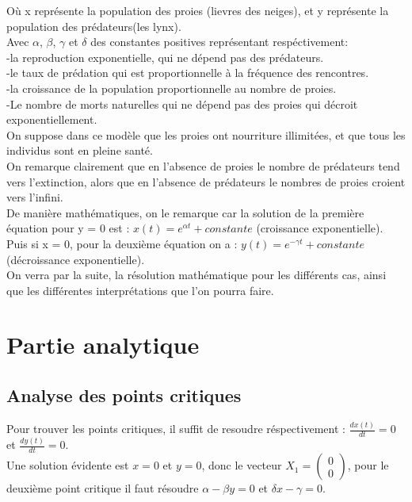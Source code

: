 \documentclass[a4paper,16pt,twoside]{report}
\begin{document}
Où x représente la population des proies (lievres des neiges), et y représente la population des prédateurs(les lynx).\\




Avec $\alpha$, $\beta$, $\gamma$ et $\delta$ des constantes positives représentant respéctivement:\\
    -la reproduction exponentielle, qui ne dépend pas des prédateurs.\\
    -le taux de prédation qui est proportionnelle à la fréquence des rencontres.\\
    -la croissance de la population proportionnelle au nombre de proies.\\
    -Le nombre de morts naturelles qui ne dépend pas des proies qui décroit exponentiellement.\\
    
    
    On suppose dans ce modèle que les proies ont nourriture illimitées, et que tous les individus sont en pleine santé.\\
    On remarque clairement que en l'absence de proies le nombre de prédateurs tend vers l'extinction, alors que en l'absence de prédateurs le nombres de proies croient vers l'infini.\\
    
    
    
    De manière mathématiques, on le remarque car la solution de la première équation pour y = 0 est : $x(t)=e^{\alpha t}+constante$ (croissance exponentielle).\\ Puis si x = 0, pour la deuxième équation on a : $y(t)=e^{- \gamma t}+ constante$ (décroissance exponentielle).\\
    
    
    
    On verra par la suite, la résolution mathématique pour les différents cas, ainsi que les différentes interprétations que l'on pourra faire.\\
    
    \chapter{Partie analytique}
    
\section{Analyse des points critiques}
Pour trouver les points critiques, il suffit de resoudre réspectivement : $\frac{dx(t)}{dt} = 0$ et $\frac{dy(t)}{dt} = 0$.\\
Une solution évidente est $x = 0$ et $y =0$, donc le vecteur $X_1 = \begin{pmatrix} 0\\0 \end{pmatrix}$, pour le deuxième point critique il faut résoudre $\alpha - \beta y = 0$ et $\delta x - \gamma = 0$.
    
\end{document}
